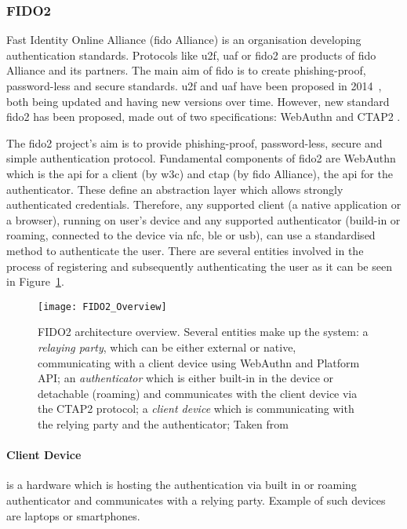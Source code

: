 \subsubsection{FIDO2}

Fast Identity Online Alliance (\acrshort{fido} Alliance) is an organisation developing authentication standards. Protocols like \acrfull{u2f}, \acrfull{uaf} or \acrshort{fido}2 are products of \acrshort{fido} Alliance and its partners.
The main aim of \acrshort{fido} is to create phishing-proof, password-less and secure standards. \acrshort{u2f} and \acrshort{uaf} have been proposed in 2014~\cite{Lindemann2014FIDOV1.0, Srinivas2014UniversalU2F}, both being updated and having new versions over time. However, new standard  \acrshort{fido}2 has been proposed, made out of two specifications: WebAuthn \cite{Balfanz2019Web1} and CTAP2 \cite{Brand2019ClientCTAP}.

The \acrshort{fido}2 project’s aim is to provide phishing-proof, password-less, secure and simple authentication protocol. Fundamental components of \acrshort{fido}2 are WebAuthn which is the \acrshort{api} for a client (by \acrshort{w3c}) and \acrshort{ctap} (by \acrshort{fido} Alliance), the \acrshort{api} for the authenticator. These define an abstraction layer which allows strongly authenticated credentials. Therefore, any supported client (a native application or a browser), running on user’s device and any supported authenticator (build-in or roaming, connected to the device via \acrshort{nfc}, \acrshort{ble} or \acrshort{usb}), can use a standardised method to authenticate the user. There are several entities involved in the process of registering and subsequently authenticating the user as it can be seen in Figure~\ref{fig:fido2_overview}.

\begin{figure}[ht]
    \centering
    \texttt{[image: FIDO2\_Overview]}
    \caption{FIDO2 architecture overview. Several entities make up the system: a \textit{relaying party}, which can be either external or native, communicating with a client device using WebAuthn and Platform API; an \textit{authenticator} which is either built-in in the device or detachable (roaming) and communicates with the client device via the CTAP2 protocol; a \textit{client device} which is communicating with the relying party and the authenticator; Taken from~\cite{Dingle2018All288910}}
    \label{fig:fido2_overview}
\end{figure}

\paragraph{Client Device} 
is a hardware which is hosting the authentication via built in or roaming authenticator and communicates with a relying party. Example of such devices are laptops or smartphones. 


